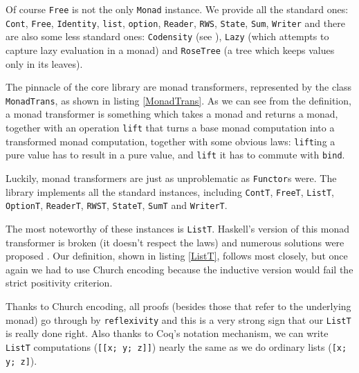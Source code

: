 \documentclass[declaration,inz,english,shortabstract]{iithesis}
\newcommand{\m}[1]{\texttt{#1}}
\begin{document}
Of course \m{Free} is not the only \m{Monad} instance. We provide all the standard ones: \m{Cont}, \m{Free}, \m{Identity}, \m{list}, \m{option}, \m{Reader}, \m{RWS}, \m{State}, \m{Sum}, \m{Writer} and there are also some less standard ones: \m{Codensity} (see \cite{ReflectionWithoutRemorse}), \m{Lazy} (which attempts to capture lazy evaluation in a monad) and \m{RoseTree} (a tree which keeps values only in its leaves).


The pinnacle of the core library are monad transformers, represented by the class \m{MonadTrans}, as shown in listing \ref{MonadTrans}. As we can see from the definition, a monad transformer is something which takes a monad and returns a monad, together with an operation \m{lift} that turns a base monad computation into a transformed monad computation, together with some obvious laws: \m{lift}ing a pure value has to result in a pure value, and \m{lift} it has to commute with \m{bind}.

Luckily, monad transformers are just as unproblematic as \m{Functor}s were. The library implements all the standard instances, including \m{ContT}, \m{FreeT}, \m{ListT}, \m{OptionT}, \m{ReaderT}, \m{RWST}, \m{StateT}, \m{SumT} and \m{WriterT}.


The most noteworthy of these instances is \m{ListT}. Haskell's version of this monad transformer is broken (it doesn't respect the laws) and numerous solutions were proposed \cite{ListT1} \cite{ListT2} \cite{ListT3}. Our definition, shown in listing \ref{ListT}, follows \cite{ListT1} most closely, but once again we had to use Church encoding because the inductive version would fail the strict positivity criterion.

Thanks to Church encoding, all proofs (besides those that refer to the underlying monad) go through by \m{reflexivity} and this is a very strong sign that our \m{ListT} is really done right. Also thanks to Coq's notation mechanism, we can write \m{ListT} computations (\m{[[x; y; z]]}) nearly the same as we do ordinary lists (\m{[x; y; z]}).
\end{document}
